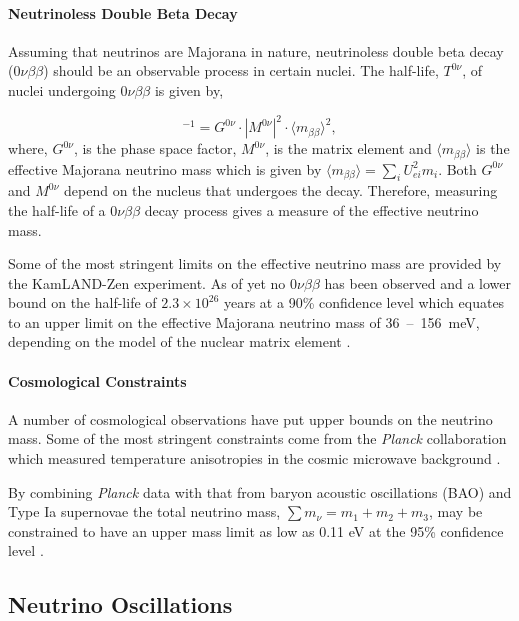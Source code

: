\paragraph{Neutrinoless Double Beta Decay}
Assuming that neutrinos are Majorana in nature, neutrinoless double beta decay (0$\nu\beta\beta$) should be an observable process in certain nuclei. The half-life, $T^{0\nu}$, of nuclei undergoing $0\nu\beta\beta$ is given by, 

\begin{equation}
    [T^{0\nu}]^{-1} = G^{0\nu} \cdot |M^{0\nu}|^2 \cdot \langle m_{\beta\beta}\rangle^2,
\end{equation}
where, $G^{0\nu}$, is the phase space factor, $M^{0\nu}$, is the matrix element and $\langle m_{\beta\beta}\rangle$ is the effective Majorana neutrino mass which is given by $\langle m_{\beta\beta}\rangle = \sum_i U^2_{ei}m_i$. Both $G^{0\nu}$ and $M^{0\nu}$ depend on the nucleus that undergoes the decay. Therefore, measuring the half-life of a $0\nu\beta\beta$ decay process gives a measure of the effective neutrino mass. 

Some of the most stringent limits on the effective neutrino mass are provided by the KamLAND-Zen experiment. As of yet no $0\nu\beta\beta$ has been observed and a lower bound on the half-life of $2.3 \times 10^{26}$ years at a 90\% confidence level which equates to an upper limit on the effective Majorana neutrino mass of \mbox{36 -- 156 meV}, depending on the model of the nuclear matrix element \cite{kamlandZen}.

\paragraph{Cosmological Constraints}
A number of cosmological observations have put upper bounds on the neutrino mass. Some of the most stringent constraints come from the \textit{Planck} collaboration which measured temperature anisotropies in the cosmic microwave background \cite{PDG_2022}\cite{planck_2018}. 

By combining \textit{Planck} data with that from baryon acoustic oscillations (BAO) and Type Ia supernovae the total neutrino mass, $\sum m_\nu = m_1 + m_2 + m_3$, may be constrained to have an upper mass limit as low as 0.11 eV at the 95\% confidence level \cite{PDG_2022}\cite{planck_2018}.

\subsection{Neutrino Oscillations}\label{subsec:Neutrino Oscillations}

